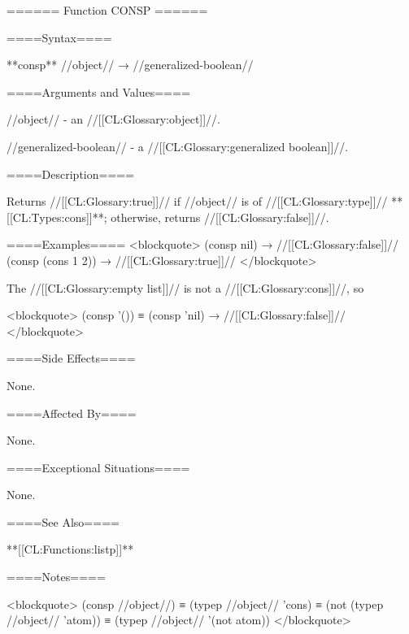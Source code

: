 ====== Function CONSP ======

====Syntax====

**consp** //object// → //generalized-boolean//

====Arguments and Values====

//object// - an //[[CL:Glossary:object]]//.

//generalized-boolean// - a //[[CL:Glossary:generalized boolean]]//.

====Description====

Returns //[[CL:Glossary:true]]// if //object// is of //[[CL:Glossary:type]]// **[[CL:Types:cons]]**; otherwise, returns //[[CL:Glossary:false]]//.

====Examples==== <blockquote> (consp nil) → //[[CL:Glossary:false]]// (consp (cons 1 2)) → //[[CL:Glossary:true]]// </blockquote>

The //[[CL:Glossary:empty list]]// is not a //[[CL:Glossary:cons]]//, so

<blockquote> (consp '()) ≡ (consp 'nil) → //[[CL:Glossary:false]]// </blockquote>

====Side Effects====

None.

====Affected By====

None.

====Exceptional Situations====

None.

====See Also====

**[[CL:Functions:listp]]**

====Notes====

<blockquote> (consp //object//) ≡ (typep //object// 'cons) ≡ (not (typep //object// 'atom)) ≡ (typep //object// '(not atom)) </blockquote>

